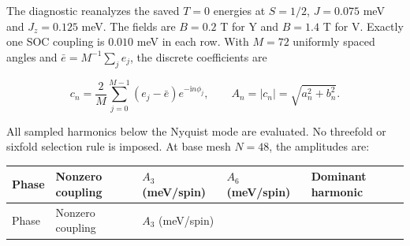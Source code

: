 The diagnostic reanalyzes the saved \(T=0\) energies at \(S=1/2\),
\(J=0.075\) meV and \(J_z=0.125\) meV. The fields are \(B=0.2\) T for Y
and \(B=1.4\) T for V. Exactly one SOC coupling is \(0.010\) meV in each
row. With \(M=72\) uniformly spaced angles and
\(\bar e=M^{-1}\sum_j e_j\), the discrete coefficients are

\[
c_n=\frac{2}{M}\sum_{j=0}^{M-1}(e_j-\bar e)e^{-\mathrm i n\phi_j},
\qquad A_n=|c_n|=\sqrt{a_n^2+b_n^2}.
\]

All sampled harmonics below the Nyquist mode are evaluated. No threefold
or sixfold selection rule is imposed. At base mesh \(N=48\), the
amplitudes are:

\begin{longtable}[]{@{}
  >{\raggedright\arraybackslash}p{}
  >{\raggedright\arraybackslash}p{}
  >{\raggedleft\arraybackslash}p{}
  >{\raggedleft\arraybackslash}p{}
  >{\raggedleft\arraybackslash}p{}@{}}
\toprule\noalign{}
\begin{minipage}[b]{\linewidth}\raggedright
Phase
\end{minipage} & \begin{minipage}[b]{\linewidth}\raggedright
Nonzero coupling
\end{minipage} & \begin{minipage}[b]{\linewidth}\raggedleft
\(A_3\) (meV/spin)
\end{minipage} & \begin{minipage}[b]{\linewidth}\raggedleft
\(A_6\) (meV/spin)
\end{minipage} & \begin{minipage}[b]{\linewidth}\raggedleft
Dominant harmonic
\end{minipage} \\
\midrule\noalign{}
\endfirsthead
\toprule\noalign{}
\begin{minipage}[b]{\linewidth}\raggedright
Phase
\end{minipage} & \begin{minipage}[b]{\linewidth}\raggedright
Nonzero coupling
\end{minipage} & \begin{minipage}[b]{\linewidth}\raggedleft
\(A_3\) (meV/spin)
\end{minipage} & \begin{minipage}[b]{\linewidth}\raggedleft

\end{minipage}
\end{longtable}
